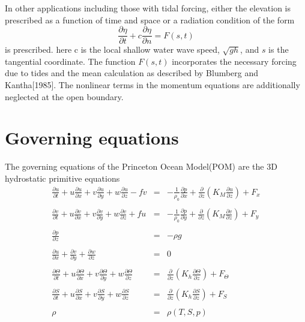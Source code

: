 \documentclass[oribibl]{llncs}
\begin{document}
 In other applications including those with tidal forcing, either the elevation is prescribed as a function of time and space or a radiation condition of the form
 \begin{equation}
 \frac{\partial \eta}{\partial t} + c \frac{\partial \eta}{\partial n}  =F(s,t)
 \end{equation}
 is prescribed. here c is the local shallow water wave speed, $\sqrt{gh}$, and $s$ is the tangential coordinate. The function $F(s,t)$ incorporates the necessary forcing due to tides and the mean calculation as described by Blumberg and Kantha[1985]. The nonlinear terms in the momentum equations are additionally neglected at the open boundary.





\section{Governing equations}

The governing equations of the Princeton Ocean Model(POM) are the 3D hydrostatic primitive equations
\begin{eqnarray}
\frac{\partial u}{\partial t}+u\frac{\partial u}{\partial x}+v\frac{\partial u}{\partial y}+w\frac{\partial u}{\partial z} -fv &=& - \frac{1}{\rho_0} \frac{\partial p}{\partial x} + \frac{\partial}{\partial z}  \left ( K_M \frac{\partial u}{\partial z} \right) +F_x\\ \nonumber \\ 
\frac{\partial v}{\partial t}+u\frac{\partial v}{\partial x}+v\frac{\partial v}{\partial y}+w\frac{\partial v}{\partial z} +fu&=& - \frac{1}{\rho_0} \frac{\partial p}{\partial y} + \frac{\partial}{\partial z}  \left ( K_M \frac{\partial v}{\partial z} \right) +F_y\\ \nonumber \\ 
\frac{\partial p}{\partial z} &=& - \rho g \\ \nonumber \\ 
\frac{\partial u}{\partial x} + \frac{\partial v}{\partial y} + \frac{\partial w}{\partial z} &=& 0 \\ \nonumber \\ 
\frac{\partial \Theta }{\partial t}+u\frac{\partial \Theta }{\partial x}+v\frac{\partial \Theta }{\partial y}+w\frac{\partial \Theta }{\partial z} &=& \frac{\partial}{\partial z}  \left ( K_h \frac{\partial \Theta }{\partial z} \right) +F_\Theta \\ \nonumber \\ 
\frac{\partial S}{\partial t}+u\frac{\partial S}{\partial x}+v\frac{\partial S}{\partial y}+w\frac{\partial S}{\partial z} &=& \frac{\partial}{\partial z}  \left ( K_h \frac{\partial S}{\partial z} \right) +F_S\\ \nonumber \\ 
\rho &=& \rho(T,S,p)
\end{eqnarray}
\end{document}
